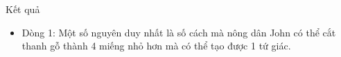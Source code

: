 Kết quả
\begin{itemize}
	\item     Dòng 1: Một số nguyên duy nhất là số cách mà nông dân John         có thể cắt thanh gỗ thành 4 miếng nhỏ hơn mà có thể tạo được 1 tứ giác.   
\end{itemize}